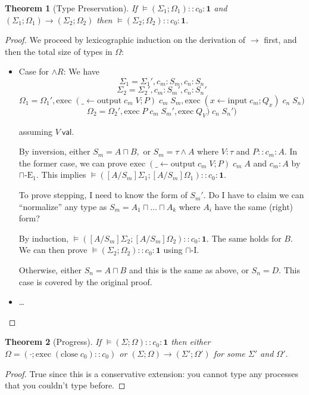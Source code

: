 \documentclass[11pt]{article}
\theoremstyle{plain}
\newtheorem{thm}{Theorem}[section]
\theoremstyle{definition}
\theoremstyle{remark}
\newcommand\intersect{\mathbin{\sqcap}}
\newcommand\terminate{\mathbf{1}}
\newcommand\tout[2]{\_ \leftarrow \mathrm{output}\;#1\;#2}
\newcommand\tin[2]{#1 \leftarrow \mathrm{input}\;#2}
\newcommand\tseq[2]{#1 ; #2}
\newcommand\close[1]{\mathrm{close}\;#1}
\newcommand{\intro}{\text{-I}}
\newcommand{\elim}{\text{-E}}
\newcommand{\val}[1]{\ensuremath{{#1}~\mathsf{val}}}
\newcommand\replace[3]{[#1/#2]#3}
\newcommand\typeProc[3]{#1 :: #2 : #3}
\newcommand\state[2]{(#1 \mathrel{;} #2)}
\newcommand\stepArrow{\longrightarrow}
\newcommand\steps[4]{\state{#1}{#2} \longrightarrow \state{#3}{#4}}
\newcommand\exec[3]{\mathrm{exec}\;{#1}\;{#2}\;{#3}}
\newcommand\execC[2]{\mathrm{exec}\;{#1} :: {#2}}
\newcommand\valid[4]{\models \typeProc{\state{#1}{#2}}{#3}{#4}}
\begin{document}
\begin{thm}[Type Preservation]
If $\valid{\Sigma_1}{\Omega_1}{c_0}{\terminate}$ and $\steps{\Sigma_1}{\Omega_1}{\Sigma_2}{\Omega_2}$ then $\valid{\Sigma_2}{\Omega_2}{c_0}{\terminate}.$
\end{thm}
\begin{proof}
We proceed by lexicographic induction on the derivation of $\stepArrow$ first, and then the total size of types in $\Omega$:

\begin{itemize}
	\item Case for $\wedge R$: We have
	\[ \Sigma_1 = \Sigma_1', c_m : S_m, c_n : S_n \]
	\[ \Sigma_2 = \Sigma_2', c_m : S_m', c_n : S_n' \]
	\[\Omega_1 = \Omega_1', \exec{(\tseq{\tout{c_m}{V}}{P})}{c_m}{S_m}, \exec{(\tseq{\tin{x}{c_m}}{Q_x})}{c_n}{S_n})\]
	\[ \Omega_2 = \Omega_2', \exec{P}{c_m}{S_m'}, \exec{Q_V)}{c_n}{S_n'}) \]
	
	assuming $\val V.$
	
	By inversion, either $S_m = A \intersect B,$ or $S_m = \tau \wedge A$ where $V : \tau$ and $\typeProc{P}{c_m}{A}.$ In the former case, we can prove $\exec{(\tseq{\tout{c_m}{V}}{P})}{c_m}{A}$ and $c_m : A$ by $\intersect\elim_1.$ This implies $\valid{\replace{A}{S_m}{\Sigma_1}}{\replace{A}{S_m}{\Omega_1}}{c_0}{\terminate}.$
	
	To prove stepping, I need to know the form of $S_m'.$ Do I have to claim we can ``normalize'' any type as $S_m = A_1 \intersect \ldots \intersect A_k$ where $A_i$ have the same (right) form?
	
	By induction, $\valid{\replace{A}{S_m}{\Sigma_2}}{\replace{A}{S_m}{\Omega_2}}{c_0}{\terminate}.$ The same holds for $B.$ We can then prove $\valid{\Sigma_2}{\Omega_2}{c_0}{\terminate}$ using $\intersect\intro.$
	
	Otherwise, either $S_n = A \intersect B$ and this is the same as above, or $S_n = D.$ This case is covered by the original proof.
	
	\item \ldots
\end{itemize}
\end{proof}

\begin{thm}[Progress]
If $\valid{\Sigma}{\Omega}{c_0}{\terminate}$ then either $\Omega = \state{\cdot}{\execC{(\close{c_0})}{c_0}}$ or $\steps{\Sigma}{\Omega}{\Sigma'}{\Omega'}$ for some $\Sigma'$ and $\Omega'.$
\end{thm}

\begin{proof}
True since this is a conservative extension: you cannot type any processes that you couldn't type before.
\end{proof}
\end{document}
